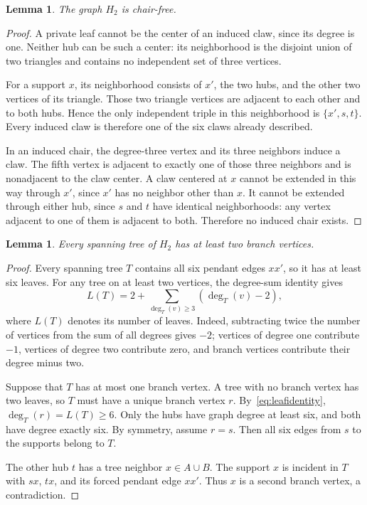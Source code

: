 \documentclass[11pt]{article}
\newtheorem{lemma}[theorem]{Lemma}
\theoremstyle{remark}
\newcommand{\degg}{\operatorname{deg}}
\begin{document}
\begin{lemma}\label{lem:h2chair}
The graph $H_2$ is chair-free.
\end{lemma}
\begin{proof}
A private leaf cannot be the center of an induced claw, since its degree is one. Neither hub can be such a center: its neighborhood is the disjoint union of two triangles and contains no independent set of three vertices.

For a support $x$, its neighborhood consists of $x'$, the two hubs, and the other two vertices of its triangle. Those two triangle vertices are adjacent to each other and to both hubs. Hence the only independent triple in this neighborhood is $\{x',s,t\}$. Every induced claw is therefore one of the six claws already described.

In an induced chair, the degree-three vertex and its three neighbors induce a claw. The fifth vertex is adjacent to exactly one of those three neighbors and is nonadjacent to the claw center. A claw centered at $x$ cannot be extended in this way through $x'$, since $x'$ has no neighbor other than $x$. It cannot be extended through either hub, since $s$ and $t$ have identical neighborhoods: any vertex adjacent to one of them is adjacent to both. Therefore no induced chair exists.
\end{proof}

\begin{lemma}\label{lem:h2branch}
Every spanning tree of $H_2$ has at least two branch vertices.
\end{lemma}
\begin{proof}
Every spanning tree $T$ contains all six pendant edges $xx'$, so it has at least six leaves. For any tree on at least two vertices, the degree-sum identity gives
\begin{equation}\label{eq:leafidentity}
 L(T)=2+\sum_{\degg_T(v)\geq3}(\degg_T(v)-2),
\end{equation}
where $L(T)$ denotes its number of leaves. Indeed, subtracting twice the number of vertices from the sum of all degrees gives $-2$; vertices of degree one contribute $-1$, vertices of degree two contribute zero, and branch vertices contribute their degree minus two.

Suppose that $T$ has at most one branch vertex. A tree with no branch vertex has two leaves, so $T$ must have a unique branch vertex $r$. By~\eqref{eq:leafidentity}, $\degg_T(r)=L(T)\geq6$. Only the hubs have graph degree at least six, and both have degree exactly six. By symmetry, assume $r=s$. Then all six edges from $s$ to the supports belong to $T$.

The other hub $t$ has a tree neighbor $x\in A\cup B$. The support $x$ is incident in $T$ with $sx$, $tx$, and its forced pendant edge $xx'$. Thus $x$ is a second branch vertex, a contradiction.
\end{proof}
\end{document}
